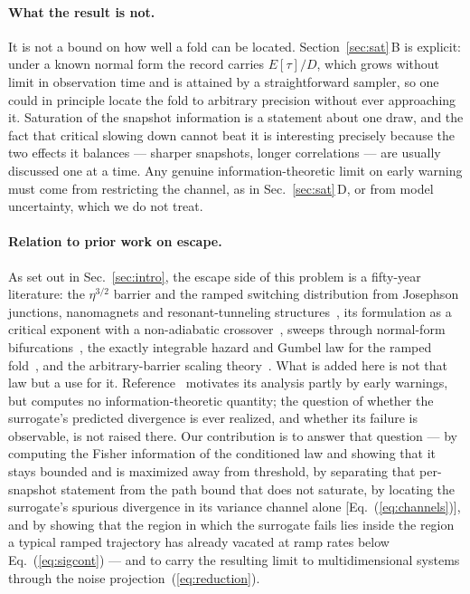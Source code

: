 \documentclass[%
 aip,
 cha,
 amsmath,amssymb,
 reprint,
 superscriptaddress,
 floatfix,
]{revtex4-2}
\begin{document}
\paragraph{What the result is not.}
It is not a bound on how well a fold can be located.  Section~\ref{sec:sat}\,B is explicit: under a known normal form the record carries $E[\tau]/D$, which grows without limit in observation time and is attained by a straightforward sampler, so one could in principle locate the fold to arbitrary precision without ever approaching it.  Saturation of the snapshot information is a statement about one draw, and the fact that critical slowing down cannot beat it is interesting precisely because the two effects it balances --- sharper snapshots, longer correlations --- are usually discussed one at a time.  Any genuine information-theoretic limit on early warning must come from restricting the channel, as in Sec.~\ref{sec:sat}\,D, or from model uncertainty, which we do not treat.

\paragraph{Relation to prior work on escape.}
As set out in Sec.~\ref{sec:intro}, the escape side of this problem is a fifty-year literature: the $\eta^{3/2}$ barrier and the ramped switching distribution from Josephson junctions, nanomagnets and resonant-tunneling structures~\cite{Kurkijarvi1972,FultonDunkelberger1974,DykmanKrivoglaz1980,Victora1989,Garg1995,Tretiakov2003}, its formulation as a critical exponent with a non-adiabatic crossover~\cite{DykmanGoldingRyvkine2004,RyvkineDykmanGolding2004}, sweeps through normal-form bifurcations~\cite{MillerShaw2012}, the exactly integrable hazard and Gumbel law for the ramped fold~\cite{HerbertBouchet2017}, and the arbitrary-barrier scaling theory~\cite{HathcockSethna2021}.  What is added here is not that law but a use for it.  Reference~\cite{HerbertBouchet2017} motivates its analysis partly by early warnings, but computes no information-theoretic quantity; the question of whether the surrogate's predicted divergence is ever realized, and whether its failure is observable, is not raised there.  Our contribution is to answer that question --- by computing the Fisher information of the conditioned law and showing that it stays bounded and is maximized away from threshold, by separating that per-snapshot statement from the path bound that does not saturate, by locating the surrogate's spurious divergence in its variance channel alone [Eq.~(\ref{eq:channels})], and by showing that the region in which the surrogate fails lies inside the region a typical ramped trajectory has already vacated at ramp rates below Eq.~(\ref{eq:sigcont}) --- and to carry the resulting limit to multidimensional systems through the noise projection~(\ref{eq:reduction}).
\end{document}
